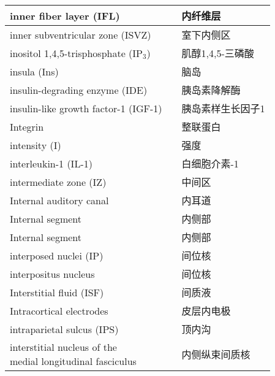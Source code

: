 \begin{longtable}{lll}
	\midrule
	inner fiber layer (IFL)   && 内纤维层  \\
	
	\midrule
	inner subventricular zone (ISVZ)   && 室下内侧区  \\
	
	\midrule
	inositol 1,4,5-trisphosphate  (IP$_3$) && 肌醇1,4,5-三磷酸  \\
	
	\midrule
	insula (Ins)   && 脑岛  \\
	
	\midrule
	insulin-degrading enzyme (IDE)   && 胰岛素降解酶  \\
	
	\midrule
	insulin-like growth factor-1 (IGF-1)   && 胰岛素样生长因子1  \\
	
	\midrule
	Integrin  && 整联蛋白  \\
	
	\midrule
	intensity (I)  && 强度  \\
	
	\midrule
	interleukin-1 (IL-1) && 白细胞介素-1  \\
	
	\midrule
	intermediate zone (IZ)  && 中间区  \\
	
	\midrule
	Internal auditory canal   && 内耳道  \\
	
	\midrule
	Internal segment  && 内侧部  \\
	
	\midrule
	Internal segment  && 内侧部  \\
	
	\midrule
	interposed nuclei (IP)  && 间位核  \\
	
	\midrule
	interpositus nucleus  && 间位核  \\
	
	\midrule
	Interstitial fluid (ISF)  && 间质液  \\
	
	\midrule
	Intracortical electrodes   && 皮层内电极  \\
	
	\midrule
	intraparietal sulcus (IPS)   && 顶内沟  \\
	
	\midrule
	\makecell[l]{interstitial nucleus of the \\medial longitudinal fasciculus}   && 内侧纵束间质核  \\
	

\end{longtable}
